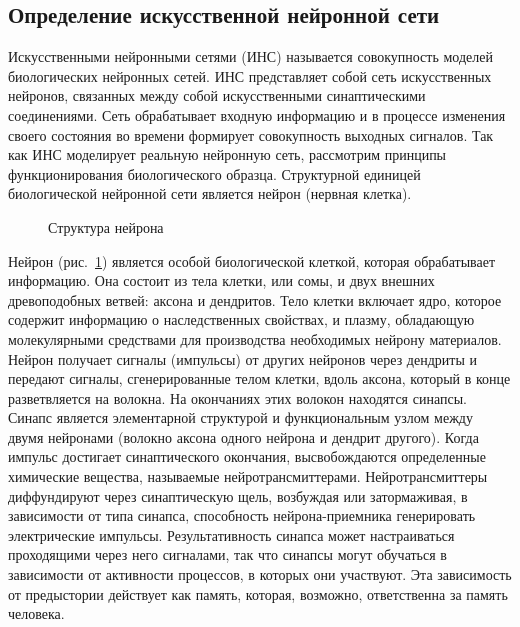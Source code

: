 \subsection{Определение искусственной нейронной сети}

Искусственными нейронными сетями (ИНС) называется совокупность моделей биологических нейронных сетей.
ИНС представляет собой сеть искусственных нейронов, связанных между собой искусственными синаптическими соединениями.
Сеть обрабатывает входную информацию и в процессе изменения своего состояния во времени формирует совокупность выходных сигналов.\cite{COURSE}
Так как ИНС моделирует реальную нейронную сеть, рассмотрим принципы функционирования биологического образца.
Структурной единицей биологической нейронной сети является нейрон (нервная клетка).

\begin{figure}[ht]
\caption{Структура нейрона}
\label{ris:neuron}
\end{figure}

Нейрон (рис.~\ref{ris:neuron}) является особой биологической клеткой, которая обрабатывает информацию.
Она состоит из тела клетки, или сомы, и двух внешних древоподобных ветвей: аксона и дендритов.
Тело клетки включает ядро, которое содержит информацию о наследственных свойствах, и плазму, обладающую молекулярными средствами для производства необходимых нейрону материалов.
Нейрон получает сигналы (импульсы) от других нейронов через дендриты и передают сигналы, сгенерированные телом клетки, вдоль аксона, который в конце разветвляется на волокна.
На окончаниях этих волокон находятся синапсы. 
Синапс является элементарной структурой и функциональным узлом между двумя нейронами (волокно аксона одного нейрона и дендрит другого).
Когда импульс достигает синаптического окончания, высвобождаются определенные химические вещества, называемые нейротрансмиттерами.
Нейротрансмиттеры диффундируют через синаптическую щель, возбуждая или затормаживая, в зависимости от типа синапса, способность нейрона-приемника генерировать электрические импульсы.
Результативность синапса может настраиваться проходящими через него сигналами, так что синапсы могут обучаться в зависимости от активности процессов, в которых они участвуют.
Эта зависимость от предыстории действует как память, которая, возможно, ответственна за память человека.
\cite{nn_int_jain}


